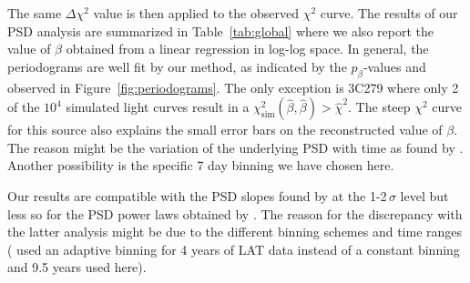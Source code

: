 \documentclass[twocolumn,linenumbers]{aastex62}
\begin{document}
The same $\Delta\chi^2$ value is then applied to the observed $\chi^2$ curve.
The results of our PSD analysis are summarized in Table~\ref{tab:global} where we also report the value of $\beta$ obtained from a linear regression in log-log space. 
In general, the periodograms are well fit by our method, as indicated by the $p_\beta$-values and observed in Figure~\ref{fig:periodograms}. 
The only exception is 3C279 where only 2 of the $10^4$ simulated light curves result in a $\chi^2_\mathrm{sim}(\hat\beta,\hat\beta) > \hat\chi^2$.
The steep $\chi^2$ curve for this source also explains the small error bars on the reconstructed value of $\beta$.
The reason might be
the variation of the underlying PSD with time as found by \citet{TheFermi-LAT:2016dss}. Another possibility is
the specific 7 day binning we have chosen here.

Our results are compatible with the PSD slopes found by \citet{2013ApJ...773..177N} at the 1-2\,$\sigma$ level but less so for the PSD power laws obtained by \citet{2014ApJ...786..143S}. 
The reason for the discrepancy with the latter analysis might be due to the different binning schemes and time ranges (\citealt{2014ApJ...786..143S} used an adaptive binning for 4 years of LAT data instead of a constant binning and 9.5 years used here). 
\end{document}
